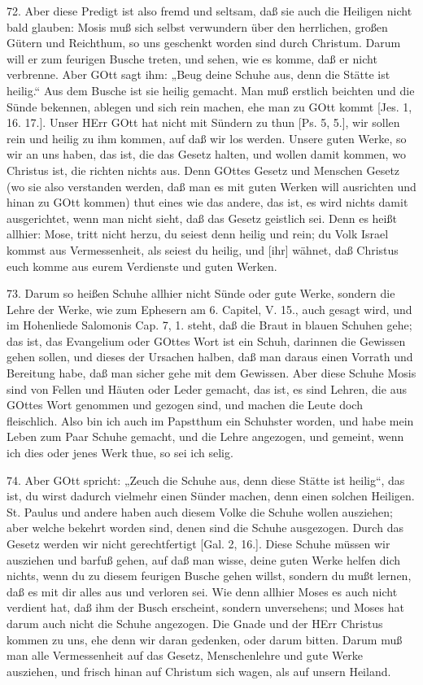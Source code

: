 72. Aber diese Predigt ist also fremd und seltsam, daß sie auch die Heiligen nicht bald glauben: Mosis muß sich selbst verwundern über den herrlichen, großen Gütern und Reichthum, so uns geschenkt worden sind durch Christum. Darum will er zum feurigen Busche treten, und sehen, wie es komme, daß er nicht verbrenne. Aber GOtt sagt ihm: „Beug deine Schuhe aus, denn die Stätte ist heilig.“ Aus dem Busche ist sie heilig gemacht. Man muß erstlich beichten und die Sünde bekennen, ablegen und sich rein machen, ehe man zu GOtt kommt [Jes. 1, 16. 17.]. Unser HErr GOtt hat nicht mit Sündern zu thun [Ps. 5, 5.], wir sollen rein und heilig zu ihm kommen, auf daß wir los werden. Unsere guten Werke, so wir an uns haben, das ist, die das Gesetz halten, und wollen damit kommen, wo Christus ist, die richten nichts aus. Denn GOttes Gesetz und Menschen Gesetz (wo sie also verstanden werden, daß man es mit guten Werken will ausrichten und hinan zu GOtt kommen) thut eines wie das andere, das ist, es wird nichts damit ausgerichtet, wenn man nicht sieht, daß das Gesetz geistlich sei. Denn es heißt allhier: Mose, tritt nicht herzu, du seiest denn heilig und rein; du Volk Israel kommst aus Vermessenheit, als seiest du heilig, und [ihr] wähnet, daß Christus euch komme aus eurem Verdienste und guten Werken.

73. Darum so heißen Schuhe allhier nicht Sünde oder gute Werke, sondern die Lehre der Werke, wie zum Ephesern am 6. Capitel, V. 15., auch gesagt wird, und im Hohenliede Salomonis Cap. 7, 1. steht, daß die Braut in blauen Schuhen gehe; das ist, das Evangelium oder GOttes Wort ist ein Schuh, darinnen die Gewissen gehen sollen, und dieses der Ursachen halben, daß man daraus einen Vorrath und Bereitung habe, daß man sicher gehe mit dem
Gewissen. Aber diese Schuhe Mosis sind von Fellen und Häuten oder Leder gemacht, das ist, es sind Lehren, die aus GOttes Wort genommen und gezogen sind, und machen die Leute doch fleischlich. Also bin ich auch im Papstthum ein Schuhster worden, und habe mein Leben zum Paar Schuhe gemacht, und die Lehre angezogen, und gemeint, wenn ich dies oder jenes Werk thue, so sei ich selig.

74. Aber GOtt spricht: „Zeuch die Schuhe aus, denn diese Stätte ist heilig“, das ist, du wirst dadurch vielmehr einen Sünder machen, denn einen solchen Heiligen. St. Paulus und andere haben auch diesem Volke die Schuhe wollen ausziehen; aber welche bekehrt worden sind, denen sind die Schuhe ausgezogen. Durch das Gesetz werden wir nicht gerechtfertigt [Gal. 2, 16.]. Diese Schuhe müssen wir ausziehen und barfuß gehen, auf daß man wisse, deine guten Werke helfen dich nichts, wenn du zu diesem feurigen Busche gehen willst, sondern du mußt lernen, daß es mit dir alles aus und verloren sei. Wie denn allhier Moses es auch nicht verdient hat, daß ihm der Busch erscheint, sondern unversehens; und Moses hat darum auch nicht die Schuhe angezogen. Die Gnade und der HErr Christus kommen zu uns, ehe denn wir daran gedenken, oder darum bitten. Darum muß man alle Vermessenheit auf das Gesetz, Menschenlehre und gute Werke ausziehen, und frisch hinan auf Christum sich wagen, als auf unsern Heiland.

